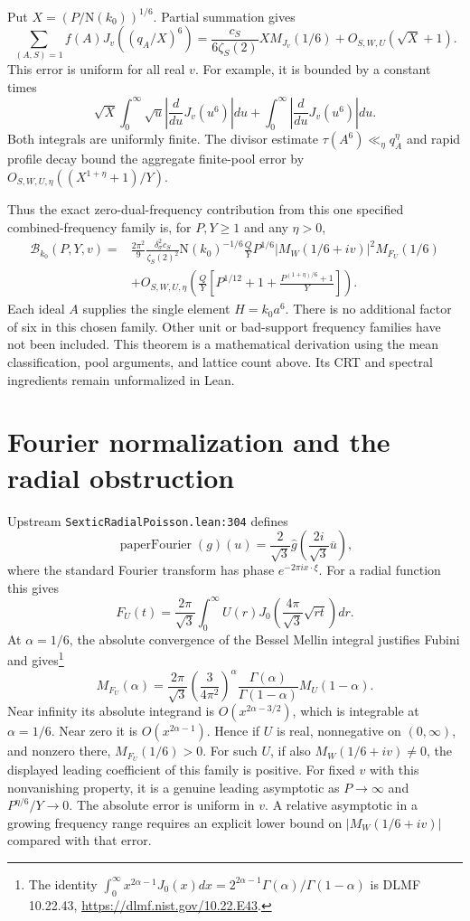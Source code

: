 \documentclass{article}
\newcommand{\Norm}{\mathrm N}
\begin{document}
Put $X=(P/\Norm(k_0))^{1/6}$.
Partial summation gives
\[
 \sum_{(A,S)=1} f(A)J_v((q_A/X)^6)
 =\frac{c_S}{6\zeta_S(2)}X M_{J_v}(1/6)
   +O_{S,W,U}(\sqrt X+1).
\]
This error is uniform for all real $v$.
For example, it is bounded by a constant times
\[
 \sqrt X\int_0^\infty\sqrt u\left|\frac d{du}J_v(u^6)\right|du
 +\int_0^\infty\left|\frac d{du}J_v(u^6)\right|du.
\]
Both integrals are uniformly finite.
The divisor estimate $\tau(A^6)\ll_\eta q_A^\eta$ and rapid profile decay
bound the aggregate finite-pool error by
$O_{S,W,U,\eta}((X^{1+\eta}+1)/Y)$.

Thus the exact zero-dual-frequency contribution from this one specified
combined-frequency family is, for $P,Y\ge1$ and any $\eta>0$,
\[
 \begin{split}
 \mathcal B_{k_0}(P,Y,v)
 ={}&\frac{2\pi^2}{9}
 \frac{\delta_\sigma^2c_S}{\zeta_S(2)^2}
 \Norm(k_0)^{-1/6}\frac QY P^{1/6}
 |M_W(1/6+iv)|^2 M_{F_U}(1/6)\\
 &+O_{S,W,U,\eta}\left(
 \frac QY\left[P^{1/12}+1+
 \frac{P^{(1+\eta)/6}+1}{Y}\right]\right).
 \end{split}
\]
Each ideal $A$ supplies the single element $H=k_0a^6$.
There is no additional factor of six in this chosen family.
Other unit or bad-support frequency families have not been included.
This theorem is a mathematical derivation using the mean classification,
pool arguments, and lattice count above.
Its CRT and spectral ingredients remain unformalized in Lean.

\section*{Fourier normalization and the radial obstruction}

Upstream \texttt{SexticRadialPoisson.lean:304} defines
\[
 \operatorname{paperFourier}(g)(u)
 =\frac2{\sqrt3}\widehat g\left(\frac{2i}{\sqrt3}\overline u\right),
\]
where the standard Fourier transform has phase $e^{-2\pi i x\cdot\xi}$.
For a radial function this gives
\[
 F_U(t)=\frac{2\pi}{\sqrt3}\int_0^\infty
 U(r)J_0\left(\frac{4\pi}{\sqrt3}\sqrt{rt}\right)dr.
\]
At $\alpha=1/6$, the absolute convergence of the Bessel Mellin integral
justifies Fubini and gives\footnote{The identity
$\int_0^\infty x^{2\alpha-1}J_0(x)dx
=2^{2\alpha-1}\Gamma(\alpha)/\Gamma(1-\alpha)$ is
DLMF 10.22.43, \url{https://dlmf.nist.gov/10.22.E43}.}
\[
 M_{F_U}(\alpha)
 =\frac{2\pi}{\sqrt3}
 \left(\frac3{4\pi^2}\right)^\alpha
 \frac{\Gamma(\alpha)}{\Gamma(1-\alpha)}M_U(1-\alpha).
\]
Near infinity its absolute integrand is
$O(x^{2\alpha-3/2})$, which is integrable at $\alpha=1/6$.
Near zero it is $O(x^{2\alpha-1})$.
Hence if $U$ is real, nonnegative on $(0,\infty)$, and nonzero there,
$M_{F_U}(1/6)>0$.
For such $U$, if also $M_W(1/6+iv)\ne0$, the displayed leading coefficient
of this family is positive.
For fixed $v$ with this nonvanishing property, it is a genuine leading
asymptotic as $P\to\infty$ and $P^{\eta/6}/Y\to0$.
The absolute error is uniform in $v$.
A relative asymptotic in a growing frequency range requires an explicit
lower bound on $|M_W(1/6+iv)|$ compared with that error.
\end{document}
